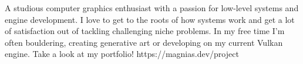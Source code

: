 

\begin{cvparagraph}
	A studious computer graphics enthusiast with a passion for low-level systems and engine development. I love to get to the roots of how systems work and get a lot of satisfaction out of tackling challenging niche problems. In my free time I'm often bouldering, creating generative art or developing on my current Vulkan engine. Take a look at my portfolio! https://magnias.dev/project
\end{cvparagraph}


